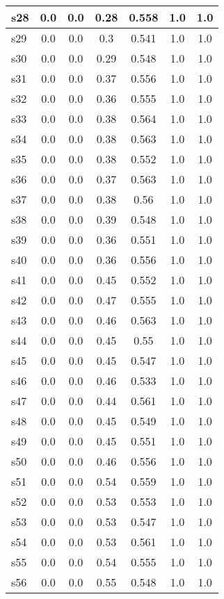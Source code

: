 \documentclass{article}
\begin{document}
\begin{tabular}{|l|c|c|c|c|c|c|}
\hline
s28 &0.0 & 0.0 & 0.28 & 0.558 & 1.0 & 1.0\\
\hline
s29 &0.0 & 0.0 & 0.3 & 0.541 & 1.0 & 1.0\\
\hline
s30 &0.0 & 0.0 & 0.29 & 0.548 & 1.0 & 1.0\\
\hline
s31 &0.0 & 0.0 & 0.37 & 0.556 & 1.0 & 1.0\\
\hline
s32 &0.0 & 0.0 & 0.36 & 0.555 & 1.0 & 1.0\\
\hline
s33 &0.0 & 0.0 & 0.38 & 0.564 & 1.0 & 1.0\\
\hline
s34 &0.0 & 0.0 & 0.38 & 0.563 & 1.0 & 1.0\\
\hline
s35 &0.0 & 0.0 & 0.38 & 0.552 & 1.0 & 1.0\\
\hline
s36 &0.0 & 0.0 & 0.37 & 0.563 & 1.0 & 1.0\\
\hline
s37 &0.0 & 0.0 & 0.38 & 0.56 & 1.0 & 1.0\\
\hline
s38 &0.0 & 0.0 & 0.39 & 0.548 & 1.0 & 1.0\\
\hline
s39 &0.0 & 0.0 & 0.36 & 0.551 & 1.0 & 1.0\\
\hline
s40 &0.0 & 0.0 & 0.36 & 0.556 & 1.0 & 1.0\\
\hline
s41 &0.0 & 0.0 & 0.45 & 0.552 & 1.0 & 1.0\\
\hline
s42 &0.0 & 0.0 & 0.47 & 0.555 & 1.0 & 1.0\\
\hline
s43 &0.0 & 0.0 & 0.46 & 0.563 & 1.0 & 1.0\\
\hline
s44 &0.0 & 0.0 & 0.45 & 0.55 & 1.0 & 1.0\\
\hline
s45 &0.0 & 0.0 & 0.45 & 0.547 & 1.0 & 1.0\\
\hline
s46 &0.0 & 0.0 & 0.46 & 0.533 & 1.0 & 1.0\\
\hline
s47 &0.0 & 0.0 & 0.44 & 0.561 & 1.0 & 1.0\\
\hline
s48 &0.0 & 0.0 & 0.45 & 0.549 & 1.0 & 1.0\\
\hline
s49 &0.0 & 0.0 & 0.45 & 0.551 & 1.0 & 1.0\\
\hline
s50 &0.0 & 0.0 & 0.46 & 0.556 & 1.0 & 1.0\\
\hline
s51 &0.0 & 0.0 & 0.54 & 0.559 & 1.0 & 1.0\\
\hline
s52 &0.0 & 0.0 & 0.53 & 0.553 & 1.0 & 1.0\\
\hline
s53 &0.0 & 0.0 & 0.53 & 0.547 & 1.0 & 1.0\\
\hline
s54 &0.0 & 0.0 & 0.53 & 0.561 & 1.0 & 1.0\\
\hline
s55 &0.0 & 0.0 & 0.54 & 0.555 & 1.0 & 1.0\\
\hline
s56 &0.0 & 0.0 & 0.55 & 0.548 & 1.0 & 1.0\\

\end{tabular}
\end{document}
